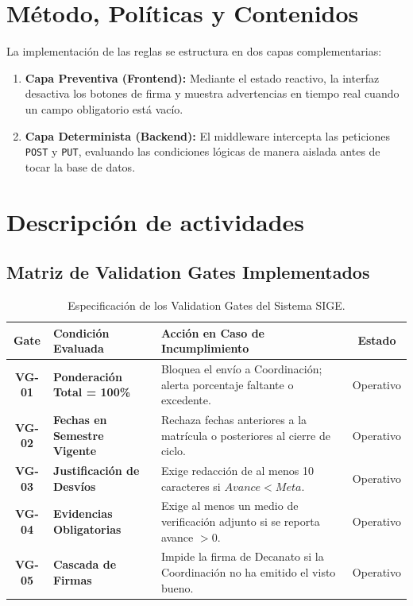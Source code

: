\documentclass[12pt,a4paper]{article}
\begin{document}
\section{Método, Políticas y Contenidos}
La implementación de las reglas se estructura en dos capas complementarias:
\begin{enumerate}[leftmargin=1.5em, itemsep=2pt]
    \item \textbf{Capa Preventiva (Frontend):} Mediante el estado reactivo, la interfaz desactiva los botones de firma y muestra advertencias en tiempo real cuando un campo obligatorio está vacío.
    \item \textbf{Capa Determinista (Backend):} El middleware intercepta las peticiones \texttt{POST} y \texttt{PUT}, evaluando las condiciones lógicas de manera aislada antes de tocar la base de datos.
\end{enumerate}

\section{Descripción de actividades}

\subsection{Matriz de Validation Gates Implementados}

\begin{table}[htbp]
\centering
\small
\renewcommand{\arraystretch}{1.25}
\begin{tabularx}{\textwidth}{|c|>{\raggedright\arraybackslash\bfseries}m{3.2cm}|X|c|}
\hline
\rowcolor{tableheader}
\textbf{Gate} & \textbf{Condición Evaluada} & \textbf{Acción en Caso de Incumplimiento} & \textbf{Estado} \\
\hline
\textbf{VG-01} & Ponderación Total = 100\% & Bloquea el envío a Coordinación; alerta porcentaje faltante o excedente. & Operativo \\
\hline
\textbf{VG-02} & Fechas en Semestre Vigente & Rechaza fechas anteriores a la matrícula o posteriores al cierre de ciclo. & Operativo \\
\hline
\textbf{VG-03} & Justificación de Desvíos & Exige redacción de al menos 10 caracteres si $Avance < Meta$. & Operativo \\
\hline
\textbf{VG-04} & Evidencias Obligatorias & Exige al menos un medio de verificación adjunto si se reporta avance $> 0$. & Operativo \\
\hline
\textbf{VG-05} & Cascada de Firmas & Impide la firma de Decanato si la Coordinación no ha emitido el visto bueno. & Operativo \\
\hline
\end{tabularx}
\caption{Especificación de los Validation Gates del Sistema SIGE.}
\end{table}
\end{document}

